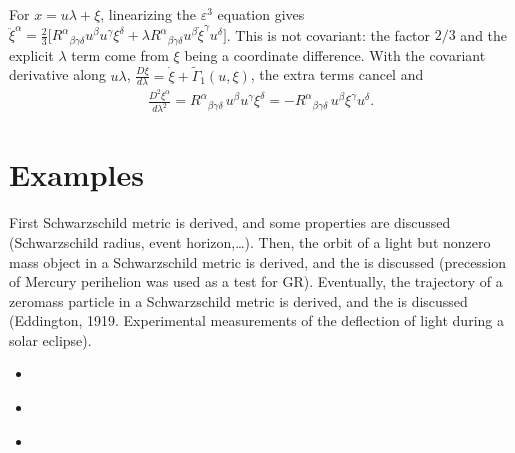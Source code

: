 \documentclass[letterpaper,10pt,english]{jupyterBook}
\begin{document}
\sphinxAtStartPar
{} For \(x=u\lambda+\xi\), linearizing the \(\varepsilon^3\) equation gives
\(\ddot\xi^\alpha=\tfrac23\big[R^\alpha{}_{\beta\gamma\delta}u^\beta u^\gamma\xi^\delta+\lambda R^\alpha{}_{\beta\gamma\delta}u^\beta\dot\xi^\gamma u^\delta\big]\).
This is not covariant: the factor \(2/3\) and the explicit \(\lambda\) term come from \(\xi\) being a coordinate difference. With the covariant derivative along \(u\lambda\), \(\frac{D\xi}{d\lambda}=\dot\xi+\tilde\Gamma_1(u,\xi)\), the extra terms cancel and
\begin{equation*}
\begin{split}
\frac{D^2\xi^\alpha}{d\lambda^2}=R^\alpha{}_{\beta\gamma\delta}\,u^\beta u^\gamma\xi^\delta=-R^\alpha{}_{\beta\gamma\delta}\,u^\beta\xi^\gamma u^\delta .
\end{split}
\end{equation*}
\sphinxstepscope


\section{Examples}
\label{\detokenize{ch/relativity-general/examples:examples}}\label{\detokenize{ch/relativity-general/examples:relativity-general-notes-examples}}\label{\detokenize{ch/relativity-general/examples::doc}}
\sphinxAtStartPar
{} First Schwarzschild metric is derived, and some properties are discussed (Schwarzschild radius, event horizon,…). Then, the orbit of a light but non\sphinxhyphen{}zero mass object in a Schwarzschild metric is derived, and the  is discussed (precession of Mercury perihelion was used as a test for GR). Eventually, the trajectory of a zero\sphinxhyphen{}mass particle in a Schwarzschild metric is derived, and the  is discussed (Eddington, 1919. Experimental measurements of the deflection of light during a solar eclipse).
\begin{itemize}
\item {} 
\sphinxAtStartPar
{\hyperref[\detokenize{ch/relativity-general/schwarzschild-metric:relativity-general-notes-examples-schwarzschild}]{}}

\item {} 
\sphinxAtStartPar
{\hyperref[\detokenize{ch/relativity-general/schwarzschild-orbits:relativity-general-notes-examples-schwarzschild-orbits}]{}}

\item {} 
\sphinxAtStartPar
{\hyperref[\detokenize{ch/relativity-general/rays-of-light-deflection:relativity-general-notes-examples-deflection-of-ray-of-light}]{}}

\end{itemize}
\end{document}

